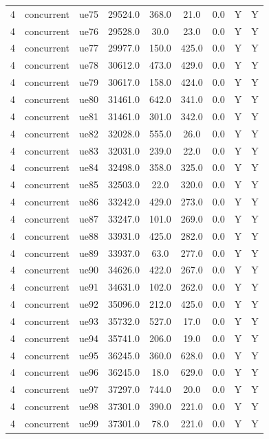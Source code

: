 \begin{table}[ht]
\begin{tabular}{|c|c|c|c|c|c|c|c|c|}
4 & concurrent & ue75 & 29524.0 & 368.0 & 21.0 & 0.0 & Y & Y \\
4 & concurrent & ue76 & 29528.0 & 30.0 & 23.0 & 0.0 & Y & Y \\
4 & concurrent & ue77 & 29977.0 & 150.0 & 425.0 & 0.0 & Y & Y \\
4 & concurrent & ue78 & 30612.0 & 473.0 & 429.0 & 0.0 & Y & Y \\
4 & concurrent & ue79 & 30617.0 & 158.0 & 424.0 & 0.0 & Y & Y \\
4 & concurrent & ue80 & 31461.0 & 642.0 & 341.0 & 0.0 & Y & Y \\
4 & concurrent & ue81 & 31461.0 & 301.0 & 342.0 & 0.0 & Y & Y \\
4 & concurrent & ue82 & 32028.0 & 555.0 & 26.0 & 0.0 & Y & Y \\
4 & concurrent & ue83 & 32031.0 & 239.0 & 22.0 & 0.0 & Y & Y \\
4 & concurrent & ue84 & 32498.0 & 358.0 & 325.0 & 0.0 & Y & Y \\
4 & concurrent & ue85 & 32503.0 & 22.0 & 320.0 & 0.0 & Y & Y \\
4 & concurrent & ue86 & 33242.0 & 429.0 & 273.0 & 0.0 & Y & Y \\
4 & concurrent & ue87 & 33247.0 & 101.0 & 269.0 & 0.0 & Y & Y \\
4 & concurrent & ue88 & 33931.0 & 425.0 & 282.0 & 0.0 & Y & Y \\
4 & concurrent & ue89 & 33937.0 & 63.0 & 277.0 & 0.0 & Y & Y \\
4 & concurrent & ue90 & 34626.0 & 422.0 & 267.0 & 0.0 & Y & Y \\
4 & concurrent & ue91 & 34631.0 & 102.0 & 262.0 & 0.0 & Y & Y \\
4 & concurrent & ue92 & 35096.0 & 212.0 & 425.0 & 0.0 & Y & Y \\
4 & concurrent & ue93 & 35732.0 & 527.0 & 17.0 & 0.0 & Y & Y \\
4 & concurrent & ue94 & 35741.0 & 206.0 & 19.0 & 0.0 & Y & Y \\
4 & concurrent & ue95 & 36245.0 & 360.0 & 628.0 & 0.0 & Y & Y \\
4 & concurrent & ue96 & 36245.0 & 18.0 & 629.0 & 0.0 & Y & Y \\
4 & concurrent & ue97 & 37297.0 & 744.0 & 20.0 & 0.0 & Y & Y \\
4 & concurrent & ue98 & 37301.0 & 390.0 & 221.0 & 0.0 & Y & Y \\
4 & concurrent & ue99 & 37301.0 & 78.0 & 221.0 & 0.0 & Y & Y \\

\end{tabular}
\end{table}
